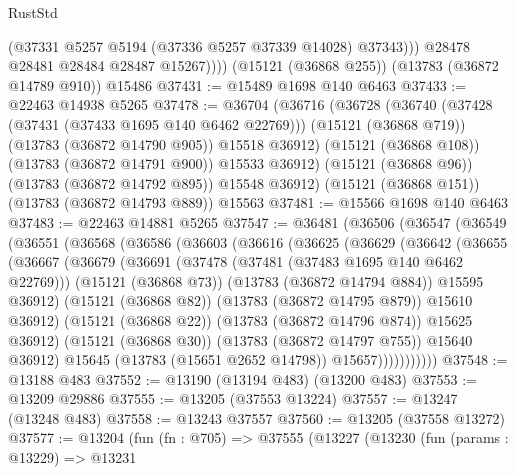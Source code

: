 \begin{lexlean}{RustStd}
\begin{coremodule}
                (@37331 @5257 @5194 (@37336 @5257 @37339 @14028) @37343)))
            @28478
            @28481
            @28484
            @28487
            @15267))))
    (@15121 (@36868 @255))
    (@13783 (@36872 @14789 @910))
    @15486
@37431 := @15489 @1698 @140 @6463
@37433 := @22463 @14938 @5265
@37478 := @36704
    (@36716
      (@36728
        (@36740
          (@37428 (@37431 (@37433 @1695 @140 @6462 @22769)))
          (@15121 (@36868 @719))
          (@13783 (@36872 @14790 @905))
          @15518
          @36912)
        (@15121 (@36868 @108))
        (@13783 (@36872 @14791 @900))
        @15533
        @36912)
      (@15121 (@36868 @96))
      (@13783 (@36872 @14792 @895))
      @15548
      @36912)
    (@15121 (@36868 @151))
    (@13783 (@36872 @14793 @889))
    @15563
@37481 := @15566 @1698 @140 @6463
@37483 := @22463 @14881 @5265
@37547 := @36481
    (@36506
      (@36547
        (@36549
          (@36551
            (@36568
              (@36586
                (@36603
                  (@36616
                    (@36625
                      (@36629
                        (@36642
                          (@36655
                            (@36667
                              (@36679
                                (@36691
                                  (@37478 (@37481 (@37483 @1695 @140 @6462 @22769)))
                                  (@15121 (@36868 @73))
                                  (@13783 (@36872 @14794 @884))
                                  @15595
                                  @36912)
                                (@15121 (@36868 @82))
                                (@13783 (@36872 @14795 @879))
                                @15610
                                @36912)
                              (@15121 (@36868 @22))
                              (@13783 (@36872 @14796 @874))
                              @15625
                              @36912)
                            (@15121 (@36868 @30))
                            (@13783 (@36872 @14797 @755))
                            @15640
                            @36912)
                          @15645
                          (@13783 (@15651 @2652 @14798))
                          @15657)))))))))))
@37548 := @13188 @483
@37552 := @13190 (@13194 @483) (@13200 @483)
@37553 := @13209 @29886
@37555 := @13205 (@37553 @13224)
@37557 := @13247 (@13248 @483)
@37558 := @13243 @37557
@37560 := @13205 (@37558 @13272)
@37577 := @13204
    (fun (fn : @705) =>
    @37555
      (@13227
        (@13230
          (fun (params : @13229) =>
          @13231

\end{coremodule}
\end{lexlean}
